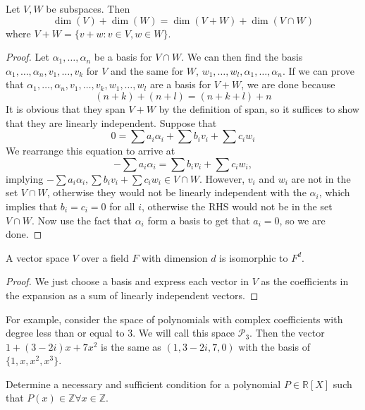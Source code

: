 \begin{prop}
Let $V, W$ be subspaces. Then
\[ \dim(V) + \dim(W) = \dim(V + W) + \dim(V \cap W) \]
where $V + W = \lbrace v + w : v \in V, w \in W \rbrace$.
\end{prop}

\begin{proof}
Let $\alpha_1, \dots, \alpha_n$ be a basis for $V \cap W$. We can then
find the basis $\alpha_1, \dots, \alpha_n, v_1, \dots, v_k$ for $V$ and
the same for $W$, $w_1, \dots, w_l, \alpha_1, \dots, \alpha_n$. If we
can prove that $\alpha_1, \dots, \alpha_n, v_1, \dots, v_k, w_1, \dots,
w_l$ are a basis for $V + W$, we are done because
\[ (n + k) + (n + l) = (n + k + l) + n \]
It is obvious that they span $V + W$ by the definition of span, so it
suffices to show that they are linearly independent. Suppose that
\[ 0 = \sum a_i \alpha_i + \sum b_i v_i + \sum c_i w_i \]
We rearrange this equation to arrive at
\[ -\sum a_i \alpha_i = \sum b_i v_i + \sum c_i w_i, \]
implying $-\sum a_i \alpha_i, \sum b_i v_i + \sum c_i w_i \in V \cap W$.
However, $v_i$ and $w_i$ are not in the set $V \cap W$, otherwise they
would not be linearly independent with the $\alpha_i$, which implies
that $b_i = c_i = 0$ for all $i$, otherwise the RHS would not be in the
set $V \cap W$. Now use the fact that $\alpha_i$ form a basis to get
that $a_i = 0$, so we are done.
\end{proof}

\begin{prop}
A vector space $V$ over a field $F$ with dimension $d$ is isomorphic to
$F^d$.
\end{prop}

\begin{proof}
We just choose a basis and express each vector in $V$ as the
coefficients in the expansion as a sum of linearly independent vectors.
\end{proof}

For example, consider the space of polynomials with complex coefficients
with degree less than or equal to $3$. We will call this space
$\mathcal{P}_3$. Then the vector $1 + (3 - 2i)x + 7x^2$ is the same as
$(1, 3 - 2i, 7, 0)$ with the basis of $\lbrace 1, x, x^2, x^3 \rbrace$.

\begin{prb}
Determine a necessary and sufficient condition for a polynomial $P \in
\mathbb{R}[X]$ such that $P(x) \in \mathbb{Z} \forall x \in
\mathbb{Z}$.
\end{prb}

